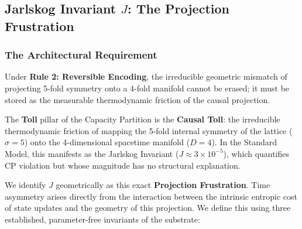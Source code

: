\subsection{Jarlskog Invariant \texorpdfstring{$J$}{J}: The Projection Frustration}
\label{subsec:jarlskog}


\subsubsection{The Architectural Requirement}
Under \textbf{Rule 2: Reversible Encoding}, the irreducible geometric mismatch of projecting 5-fold symmetry onto a 4-fold manifold cannot be erased; it must be stored as the measurable thermodynamic friction of the causal projection.

The \textbf{Toll} pillar of the Capacity Partition is the \textbf{Causal Toll}: the irreducible thermodynamic friction of mapping the 5-fold internal symmetry of the lattice ($\sigma=5$) onto the 4-dimensional spacetime manifold ($D=4$). In the Standard Model, this manifests as the Jarlskog Invariant ($J \approx 3 \times 10^{-5}$), which quantifies CP violation but whose magnitude has no structural explanation.

We identify $J$ geometrically as this exact \textbf{Projection Frustration}. Time asymmetry arises directly from the interaction between the intrinsic entropic cost of state updates and the geometry of this projection. We define this using three established, parameter-free invariants of the substrate:

